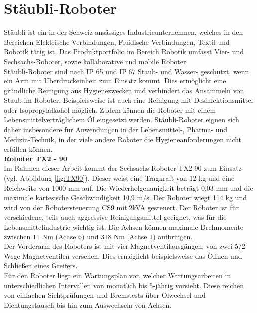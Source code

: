 \documentclass[ a4paper,
                oneside,
                toc=bibliography,
                toc=listof
                ]{scrbook}
\begin{document}
   	
   	\section{Stäubli-Roboter}
   	Stäubli ist ein in der Schweiz ansässiges Industrieunternehmen, welches in den Bereichen \glqq Elektrische Verbindungen\grqq, \glqq Fluidische Verbindungen\grqq, \glqq Textil\grqq{} und \glqq Robotik\grqq{} tätig ist. Das Produktportfolio im Bereich Robotik umfasst Vier- und Sechsachs-Roboter, sowie kollaborative und mobile Roboter. \cite{StaubliUberUns}\\ Stäubli-Roboter sind nach IP 65 und IP 67 Staub- und Wasser- geschützt, wenn ein Arm mit Überdruckeinheit zum Einsatz kommt. Dies ermöglicht eine gründliche Reinigung aus Hygienezwecken und verhindert das Ansammeln von Staub im Roboter. Beispielsweise ist auch eine Reinigung mit Desinfektionsmittel oder Isopropylalkohol möglich. Zudem können die Roboter mit einem Lebensmittelverträglichem Öl eingesetzt werden. Stäubli-Roboter eignen sich daher insbesondere für Anwendungen in der Lebensmittel-, Pharma- und Medizin-Technik, in der viele andere Roboter die Hygieneanforderungen nicht erfüllen können. \cite{StaubliProduktubersicht}\\
   	\textbf{Roboter TX2 - 90}\\
   	Im Rahmen dieser Arbeit kommt der Sechsachs-Roboter TX2-90 zum Einsatz (vgl. Abbildung \ref{fig:TX90}). Dieser weist eine Tragkraft von 12 kg und eine Reichweite von 1000 mm auf. Die Wiederholgenauigkeit beträgt 0,03 mm und die maximale kartesische Geschwindigkeit 10,9 m/s. Der Roboter wiegt 114 kg und wird von der Robotersteuerung CS9 mit 2kVA gesteuert. Der Roboter ist für verschiedene, teils auch aggressive Reinigungsmittel geeignet, was für die Lebensmittelindustrie wichtig ist. Die Achsen können maximale Drehmomente zwischen 11 Nm (Achse 6) und 318 Nm (Achse 1) aufbringen.\\
   	Der Vorderarm des Roboters ist mit vier Magnetventilausgängen, von zwei 5/2-Wege-Magnetventilen versehen. Dies ermöglicht beispielsweise das Öffnen und Schließen eines Greifers.\\
   	Für den Roboter liegt ein Wartungsplan vor, welcher Wartungsarbeiten in unterschiedlichen Intervallen von monatlich bis 5-jährig vorsieht. Diese reichen von einfachen Sichtprüfungen und Bremstests über Ölwechsel und Dichtungstausch bis hin zum Auswechseln von Achsen. \cite{X90}
\end{document}
